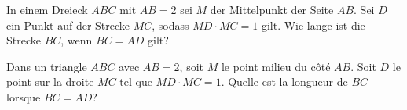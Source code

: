 In einem Dreieck $ABC$ mit $AB = 2$ sei $M$ der Mittelpunkt der Seite $AB$. Sei $D$ ein Punkt auf der Strecke $MC$, sodass $MD \cdot MC = 1$ gilt. Wie lange ist die Strecke $BC$, wenn $BC = AD$ gilt?

\bigskip

Dans un triangle $ABC$ avec $AB = 2$, soit $M$ le point milieu du côté $AB$. Soit $D$ le point sur la droite $MC$ tel que $MD \cdot MC = 1$. Quelle est la longueur de $BC$ lorsque $BC = AD$?
